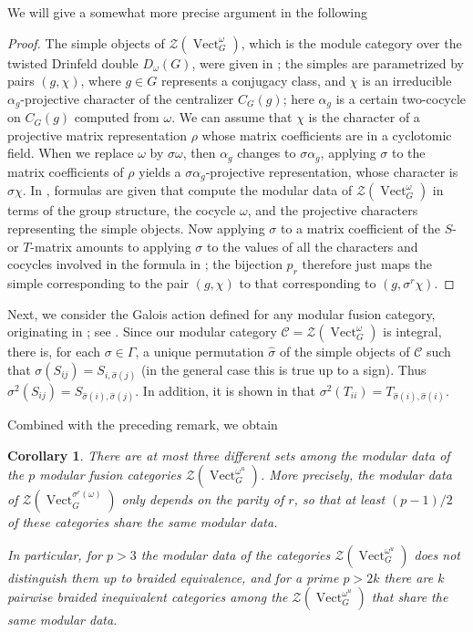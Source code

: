 \documentclass[12pt]{amsart}
\newtheorem{Cor}[Thm]{Corollary}
\theoremstyle{remark}
\theoremstyle{definition}
\numberwithin{equation}{section}
\newcommand\Vect{\operatorname{Vect}}
\newcommand\C{\mathcal C}
\newcommand\CTR{\mathcal Z}
\begin{document}
We will give a somewhat more precise argument in the following
\begin{proof}
  The simple objects of $\CTR(\Vect_G^\omega)$, which is the module category over the twisted Drinfeld double $D_\omega(G)$, were given in \cite{MR1128130}; the simples are parametrized by pairs $(g,\chi)$, where $g\in G$ represents a conjugacy class, and $\chi$ is an irreducible $\alpha_g$-projective character of the centralizer $C_G(g)$; here $\alpha_g$ is a certain two-cocycle on $C_G(g)$ computed from $\omega$. We can assume that $\chi$ is the character of a projective matrix representation $\rho$ whose matrix coefficients are in a cyclotomic field. When we replace $\omega$ by $\sigma\omega$, then $\alpha_g$ changes to $\sigma\alpha_g$, applying $\sigma$ to the matrix coefficients of $\rho$ yields a $\sigma\alpha_g$-projective representation, whose character is $\sigma\chi$. In \cite{MR1770077}, formulas are given that compute the modular data of $\CTR(\Vect_G^\omega)$ in terms of the group structure, the cocycle $\omega$, and the projective characters representing the simple objects. Now applying $\sigma$ to a matrix coefficient of the $S$- or $T$-matrix amounts to applying $\sigma$ to the values of all the characters and cocycles involved in the formula in \cite{MR1770077}; the bijection $p_r$ therefore just maps the simple corresponding to the pair  $(g,\chi)$ to that corresponding to $(g,\sigma^r\chi)$.
\end{proof}


Next, we consider the Galois action defined for any modular fusion category, originating in \cite{MR1120140,MR1266785}; see \cite[Appendix]{MR2183279}. Since our modular category $\C=\CTR(\Vect^\omega_G)$ is integral, there is, for each $\sigma\in\Gamma$, a unique permutation $\hat\sigma$ of the simple objects of $\C$ such that $\sigma(S_{ij})=S_{i,\hat\sigma(j)}$ (in the general case this is true up to a sign). Thus $\sigma^2(S_{ij})=S_{\hat\sigma(i),\hat\sigma(j)}$. In addition, it is shown in  \cite{MR3435813} that $\sigma^2(T_{ii})=T_{\hat\sigma(i),\hat\sigma(i)}$. 

Combined with the preceding remark, we obtain
\begin{Cor}
  There are at most three different sets among the modular data of the $p$ modular fusion categories $\CTR(\Vect_G^{\omega^u})$. More precisely, the modular data of $\CTR(\Vect_G^{\sigma^r(\omega)})$ only depends on the parity of $r$, so that at least $(p-1)/2$ of these categories share the same modular data.

In particular, for $p>3$ the modular data of the categories $\CTR(\Vect_G^{\omega^u})$ does not distinguish them up to braided equivalence, and for a prime $p>2k$ there are $k$ pairwise braided inequivalent categories among the $\CTR(\Vect_G^{\omega^u})$ that share the same modular data.
\end{Cor}
\end{document}
